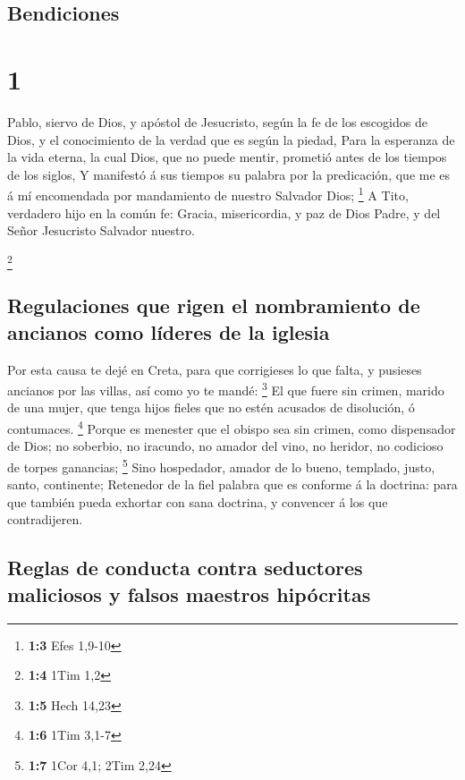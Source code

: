 \hypertarget{bendiciones}{%
\subsection{Bendiciones}\label{bendiciones}}

\hypertarget{section}{%
\section{1}\label{section}}

 Pablo, siervo de Dios, y apóstol de Jesucristo, según la fe
de los escogidos de Dios, y el conocimiento de la verdad que es según la
piedad,  Para la esperanza de la vida eterna, la cual Dios,
que no puede mentir, prometió antes de los tiempos de los siglos,
 Y manifestó á sus tiempos su palabra por la predicación,
que me es á mí encomendada por mandamiento de nuestro Salvador Dios;
\footnote{\textbf{1:3} Efes 1,9-10}  A Tito, verdadero hijo
en la común fe: Gracia, misericordia, y paz de Dios Padre, y del Señor
Jesucristo Salvador nuestro.

\footnote{\textbf{1:4} 1Tim 1,2}

\hypertarget{regulaciones-que-rigen-el-nombramiento-de-ancianos-como-luxedderes-de-la-iglesia}{%
\subsection{Regulaciones que rigen el nombramiento de ancianos como
líderes de la
iglesia}\label{regulaciones-que-rigen-el-nombramiento-de-ancianos-como-luxedderes-de-la-iglesia}}

 Por esta causa te dejé en Creta, para que corrigieses lo
que falta, y pusieses ancianos por las villas, así como yo te mandé:
\footnote{\textbf{1:5} Hech 14,23}  El que fuere sin crimen,
marido de una mujer, que tenga hijos fieles que no estén acusados de
disolución, ó contumaces. \footnote{\textbf{1:6} 1Tim 3,1-7}
 Porque es menester que el obispo sea sin crimen, como
dispensador de Dios; no soberbio, no iracundo, no amador del vino, no
heridor, no codicioso de torpes ganancias; \footnote{\textbf{1:7} 1Cor
  4,1; 2Tim 2,24}  Sino hospedador, amador de lo bueno,
templado, justo, santo, continente;  Retenedor de la fiel
palabra que es conforme á la doctrina: para que también pueda exhortar
con sana doctrina, y convencer á los que contradijeren.

\hypertarget{reglas-de-conducta-contra-seductores-maliciosos-y-falsos-maestros-hipuxf3critas}{%
\subsection{Reglas de conducta contra seductores maliciosos y falsos
maestros
hipócritas}\label{reglas-de-conducta-contra-seductores-maliciosos-y-falsos-maestros-hipuxf3critas}}

